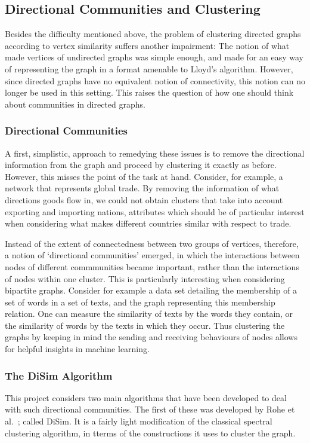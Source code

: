 \subsection{Directional Communities and Clustering}

Besides the difficulty mentioned above, the problem of clustering directed graphs according to 
vertex similarity suffers another impairment: The notion of what made vertices of undirected 
graphs was simple enough, and made for an easy way of representing the graph in a format amenable 
to Lloyd's algorithm. However, since directed graphs have no equivalent notion of connectivity, 
this notion can no longer be used in this setting. This raises the question of how one should 
think about communities in directed graphs. 

\subsubsection{Directional Communities}
A first, simplistic, approach to remedying these issues is to remove the directional information 
from the graph and proceed by clustering it exactly as before. However, this misses the point of 
the task at hand. Consider, for example, a network that represents global trade. By removing the 
information of what directions goods flow in, we could not obtain clusters that take into account 
exporting and importing nations, attributes which should be of particular interest when  
considering what makes different countries similar with respect to trade. 

Instead of the extent of connectedness between two groups of vertices, therefore, a notion of 
`directional communities' emerged, in which the interactions between nodes of different 
commmunities became important, rather than the interactions of nodes within one cluster. 
This is particularly interesting when considering bipartite graphs. Consider for example a data 
set detailing the membership of a set of words in a set of texts, and the graph representing this 
membership relation. One can measure the similarity of texts by the words they contain, or the 
similarity of words by the texts in which they occur. Thus clustering the graphs by keeping in 
mind the sending and receiving behaviours of nodes allows for helpful insights in machine learning. 

\subsubsection{The DiSim Algorithm}
This project considers two main algorithms that have been developed to deal with such directional 
communities. The first of these was developed by Rohe et al.\ ; called DiSim. It is a fairly light 
modification of the classical spectral clustering algorithm, in tterms of the constructions it 
uses to cluster the graph. 


